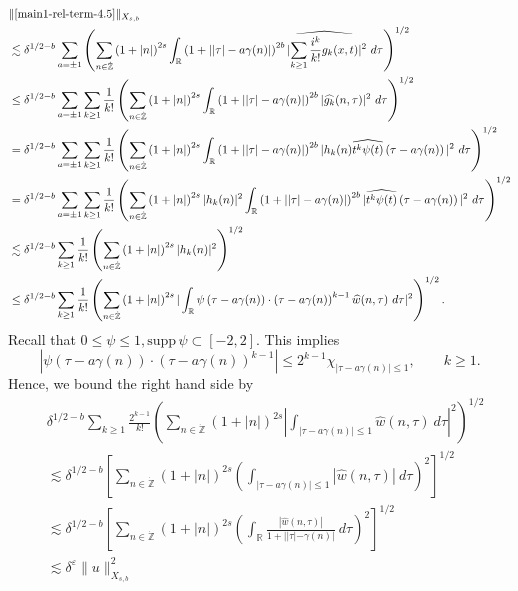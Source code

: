 \documentclass[12pt,reqno]{amsart}
\numberwithin{equation}{section}  %
\renewcommand{\cref}{\Cref}
\newcommand{\rr}{\mathbb{R}}
\newcommand{\zz}{\mathbb{Z}}
\newcommand{\zzdot}{\dot{\zz}}
\newcommand{\wh}{\widehat}
\newcommand{\ee}{\varepsilon}
\begin{document}
\begin{equation}
	\label{2n}
	\begin{split}
		& \|\cref{main1-rel-term-4.5}\|_{X_{s,b}} 
    \\
    & \lesssim \delta^{1/2 - b} \sum_{a = \pm 1} \left( \sum_{n \in \zzdot} \left (1 + |n| \right )^{2s}
    \int_\rr \left( 1 + | |\tau| - a\gamma(n) | \right)^{2b}
    | \wh{\sum_{k \ge 1} \frac{i^k}{k!}g_k(x,t)} |^2 \ d \tau
		\right)^{1/2}
		\\
		& \le \delta^{1/2 - b}\sum_{a = \pm 1}\sum_{k \ge 1} \frac{1}{k!}\left( \sum_{n \in \zzdot} \left (1 + |n| \right )^{2s}
    \int_\rr \left( 1 + | |\tau| - a\gamma(n) | \right)^{2b} | \wh{g_k}(n, \tau) |^2 \
		d \tau \right)^{1/2}
		\\
		& = \delta^{1/2 - b}\sum_{a = \pm 1}\sum_{k \ge 1} \frac{1}{k!} \left( \sum_{n \in \zzdot} \left (1 + |n| \right )^{2s}
    \int_\rr \left( 1 + | |\tau| - a\gamma(n) | \right)^{2b} | h_k(n) \wh{t^k
		\psi(t)} \left( \tau - a\gamma(n) \right) |^2 \ d \tau \right)^{1/2}
		\\
		& = \delta^{1/2 - b} \sum_{a = \pm 1}\sum_{k \ge 1} \frac{1}{k!} \left( \sum_{n \in \zzdot} \left (1 + |n| \right )^{2s} |
    h_k(n) |^2 \int_\rr \left( 1 + | |\tau| - a\gamma(n) | \right)^{2b} | \wh{t^k
		\psi(t)} \left( \tau - a\gamma(n) \right) |^2 \ d \tau \right)^{1/2}
		\\
		& \lesssim \delta^{1/2 - b}
    \sum_{k \ge 1} \frac{1}{k!} \left( \sum_{n \in \zzdot} \left (1 + |n| \right )^{2s} | h_k(n) |^2 
		\right)^{1/2}
		\\
    & \le \delta^{1/2 - b}\sum_{k \ge 1} \frac{1}{k!}
		\left( \sum_{n \in \zzdot} \left (1 + |n| \right )^{2s} |\int_\rr 
		\psi\left( \tau - a\gamma(n) \right) \cdot \left( \tau - a\gamma(n) 
    \right)^{k -1} \wh{w}(n, \tau) \ d \tau|^{2} \right)^{1/2}.
    \end{split}
\end{equation}
%
Recall that $0 \le \psi \le 1, \text{supp} \, \psi \subset [-2,2 ]$. 
This implies $$| \psi\left( \tau - a\gamma(n) \right) \cdot \left( \tau - a\gamma(n)
\right)^{k -1} | \le 2^{k-1} \chi_{| \tau - a\gamma(n) | \le 1}, \qquad k \ge 1.$$ Hence,
we bound the right hand side by
%
\begin{equation*}
	\begin{split}
    & \delta^{1/2 - b}\sum_{k \ge 1} \frac{2^{k-1}}{k!}
    \left( \sum_{n \in \zzdot} (1 + | n |)^{2s}| 
		\int_{| \tau - a\gamma(n)  |\le 1}  \wh{w}(n, \tau) \ d \tau |^2 
		\right)^{1/2}
    \\
      & \lesssim \delta^{1/2 - b}
\left[ \sum_{n \in \zzdot} (1 + | n |)^{2s}\left (  
		\int_{| \tau - a\gamma(n)  |\le 1} | \wh{w}(n, \tau) | \ d \tau \right ) ^2 
		\right]^{1/2}
		\\
    & \lesssim \delta^{1/2 - b}\left[ \sum_{n \in \zzdot} (1 + | n |)^{2s}\left( \int_\rr
		\frac{|\wh{w}(n, \tau)|}{1 + | |\tau| - \gamma(n) |} \ d \tau \right ) ^2 
		\right]^{1/2}
		\\
		& \lesssim \delta^{\ee} \| u \|_{X_{s,b}}^{2}
  \end{split}
\end{equation*}
\end{document}
